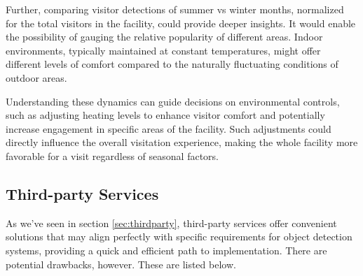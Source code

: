 Further, comparing visitor detections of summer vs winter months, normalized for the total visitors in the facility, could provide deeper insights. It would enable the possibility of gauging the relative popularity of different areas. Indoor environments, typically maintained at constant temperatures, might offer different levels of comfort compared to the naturally fluctuating conditions of outdoor areas. 

Understanding these dynamics can guide decisions on environmental controls, such as adjusting heating levels to enhance visitor comfort and potentially increase engagement in specific areas of the facility. Such adjustments could directly influence the overall visitation experience, making the whole facility more favorable for a visit regardless of seasonal factors.


\subsection{Third-party Services}
\label{sec:discuss_thirdparty}
As we've seen in section \ref{sec:thirdparty}, third-party services offer convenient solutions that may align perfectly with specific requirements for object detection systems, providing a quick and efficient path to implementation. There are potential drawbacks, however. These are listed below.

